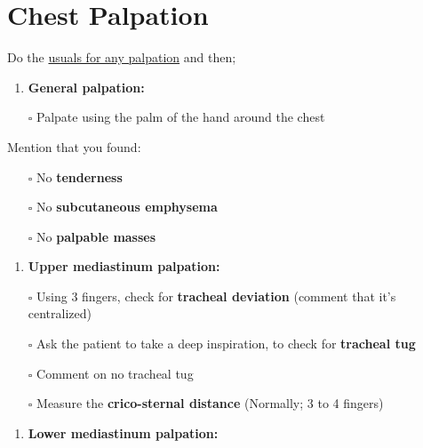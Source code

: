 \documentclass[
  13.5pt,
  a4paper,
  DIV=11,
  numbers=noendperiod]{scrreprt}
\providecommand{\tightlist}{%
  \setlength{\itemsep}{0pt}\setlength{\parskip}{0pt}}
\begin{document}
\section{Chest Palpation}\label{chest-palpation}

Do the \href{miscellaneous.qmd}{usuals for any palpation} and then;

\begin{enumerate}
\def\labelenumi{\arabic{enumi})}
\tightlist
\item
  \textbf{General palpation:}
\end{enumerate}

\begin{itemize}
\tightlist
\item[$\square$]
  Palpate using the palm of the hand around the chest
\end{itemize}

Mention that you found:

\begin{itemize}
\tightlist
\item[$\square$]
  No \textbf{tenderness}
\item[$\square$]
  No \textbf{subcutaneous emphysema}
\item[$\square$]
  No \textbf{palpable masses}
\end{itemize}

\begin{enumerate}
\def\labelenumi{\arabic{enumi})}
\setcounter{enumi}{1}
\tightlist
\item
  \textbf{Upper mediastinum palpation:}
\end{enumerate}

\begin{itemize}
\tightlist
\item[$\square$]
  Using 3 fingers, check for \textbf{tracheal deviation} (comment that
  it's centralized)
\item[$\square$]
  Ask the patient to take a deep inspiration, to check for
  \textbf{tracheal tug}
\item[$\square$]
  Comment on no tracheal tug
\item[$\square$]
  Measure the \textbf{crico-sternal distance} (Normally; 3 to 4 fingers)
\end{itemize}

\begin{enumerate}
\def\labelenumi{\arabic{enumi})}
\setcounter{enumi}{2}
\tightlist
\item
  \textbf{Lower mediastinum palpation:}
\end{enumerate}
\end{document}
